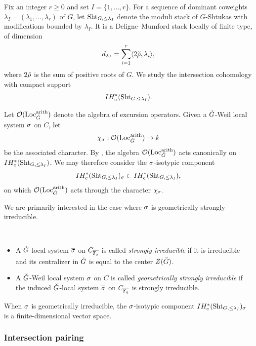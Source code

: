 \documentclass[reqno]{amsart}
\numberwithin{equation}{section}
\numberwithin{equation}{section}
\begin{document}
Fix an integer $r\geq 0$ and set $I=\{1,\dots,r\}$. For a sequence of dominant coweights $\lambda_I=(\lambda_1,\dots,\lambda_r)$ of $G$, let $\operatorname{Sht}_{G,\leq\lambda_I}$ denote the moduli stack of $G$-Shtukas with modifications bounded by $\lambda_I$. It is a Deligne--Mumford stack locally of finite type, of dimension
\[
d_{\lambda_I}=\sum_{i=1}^r \langle 2\check{\rho},\lambda_i\rangle,
\]
where $2\check{\rho}$ is the sum of positive roots of $G$. We study the intersection cohomology with compact support
\[
IH_c^*(\operatorname{Sht}_{G,\leq\lambda_I}).
\]

Let $\mathcal{O}(\mathrm{Loc}_{\check{G}}^{\mathrm{arith}})$ denote the algebra of excursion operators. Given a $\check{G}$-Weil local system $\sigma$ on $C$, let
\[
\chi_{\sigma}:\mathcal{O}(\mathrm{Loc}_{\check{G}}^{\mathrm{arith}})\to k
\]
be the associated character. By \cite{arinkin2022automorphicfunctionstracefrobenius}, the algebra $\mathcal{O}(\mathrm{Loc}_{\check{G}}^{\mathrm{arith}})$ acts canonically on $IH_c^*(\operatorname{Sht}_{G,\leq\lambda_I})$. We may therefore consider the $\sigma$-isotypic component
\[
IH_c^*(\operatorname{Sht}_{G,\leq\lambda_I})_{\sigma}
\subset
IH_c^*(\operatorname{Sht}_{G,\leq\lambda_I}),
\]
on which $\mathcal{O}(\mathrm{Loc}_{\check{G}}^{\mathrm{arith}})$ acts through the character $\chi_{\sigma}$.

We are primarily interested in the case where $\sigma$ is geometrically strongly irreducible.

\begin{defn}\label{defn:stronglyirreducible}
~
\begin{itemize}
    \item A $\check{G}$-local system $\overline{\sigma}$ on $C_{\overline{\mathbb{F}_q}}$ is called \emph{strongly irreducible} if it is irreducible and its centralizer in $\check{G}$ is equal to the center $Z(\check{G})$.
    
    \item A $\check{G}$-Weil local system $\sigma$ on $C$ is called \emph{geometrically strongly irreducible} if the induced $\check{G}$-local system $\overline{\sigma}$ on $C_{\overline{\mathbb{F}_q}}$ is strongly irreducible.
\end{itemize}
\end{defn}
When $\sigma$ is geometrically irreducible, the $\sigma$-isotypic component $IH_c^*(\operatorname{Sht}_{G,\leq\lambda_I})_{\sigma}$ is a finite-dimensional vector space.

\subsubsection{Intersection pairing}
\end{document}
